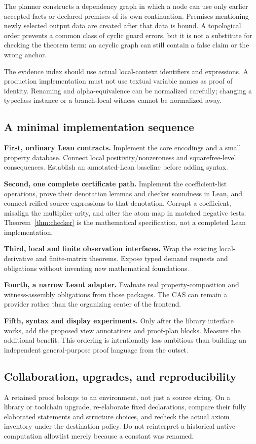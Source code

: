 \documentclass[11pt,letterpaper]{article}
\theoremstyle{definition}
\theoremstyle{remark}
\begin{document}
The planner constructs a dependency graph in which a node can use only earlier
accepted facts or declared premises of its own continuation. Premises mentioning
newly selected output data are created after that data is bound. A topological
order prevents a common class of cyclic guard errors, but it is not a substitute
for checking the theorem term: an acyclic graph can still contain a false claim
or the wrong anchor.

The evidence index should use actual local-context identifiers and expressions.
A production implementation must not use textual variable names as proof of
identity. Renaming and alpha-equivalence can be normalized carefully; changing
a typeclass instance or a branch-local witness cannot be normalized away.

\subsection{A minimal implementation sequence}
\textbf{First, ordinary Lean contracts.} Implement the core encodings and a small
property database. Connect local positivity/nonzeroness and squarefree-level
consequences. Establish an annotated-Lean baseline before adding syntax.

\textbf{Second, one complete certificate path.} Implement the coefficient-list
operations, prove their denotation lemmas and checker soundness in Lean, and
connect reified source expressions to that denotation. Corrupt a coefficient,
misalign the multiplier arity, and alter the atom map in matched negative tests.
Theorem~\ref{thm:checker} is the mathematical specification, not a completed
Lean implementation.

\textbf{Third, local and finite observation interfaces.} Wrap the existing
local-derivative and finite-matrix theorems. Expose typed demand requests and
obligations without inventing new mathematical foundations.

\textbf{Fourth, a narrow Leant adapter.} Evaluate real property-composition and
witness-assembly obligations from those packages. The CAS can remain a provider
rather than the organizing center of the frontend.

\textbf{Fifth, syntax and display experiments.} Only after the library interface
works, add the proposed view annotations and proof-plan blocks. Measure the
additional benefit. This ordering is intentionally less ambitious than building
an independent general-purpose proof language from the outset.

\subsection{Collaboration, upgrades, and reproducibility}
A retained proof belongs to an environment, not just a source string. On a
library or toolchain upgrade, re-elaborate fixed declarations, compare their
fully elaborated statements and structure choices, and recheck the actual
axiom inventory under the destination policy. Do not reinterpret a historical
native-computation allowlist merely because a constant was renamed.
\end{document}
